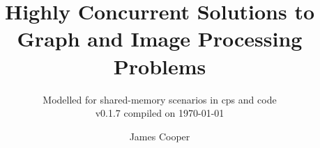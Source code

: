 \documentclass[10pt,partial,draft,doublespace]{aucklandthesis}
\theoremstyle{plain}
\begin{document}

%
%
%

\title{Highly Concurrent Solutions to Graph and Image Processing Problems}
\subtitle{Modelled for shared-memory scenarios in \gls{cps} and code \\ {\small v0.1.7 compiled on \today}}
\author{James Cooper}

\maketitle





\clearpage\tableofcontents
\clearpage\listoffigures
\clearpage\listoftables
\clearpage\listofcprulesetfloats
\clearpage\listofcpobjectsfloats
\clearpage\listoffixmes

%
%
%
%

\mainmatter
\end{document}
